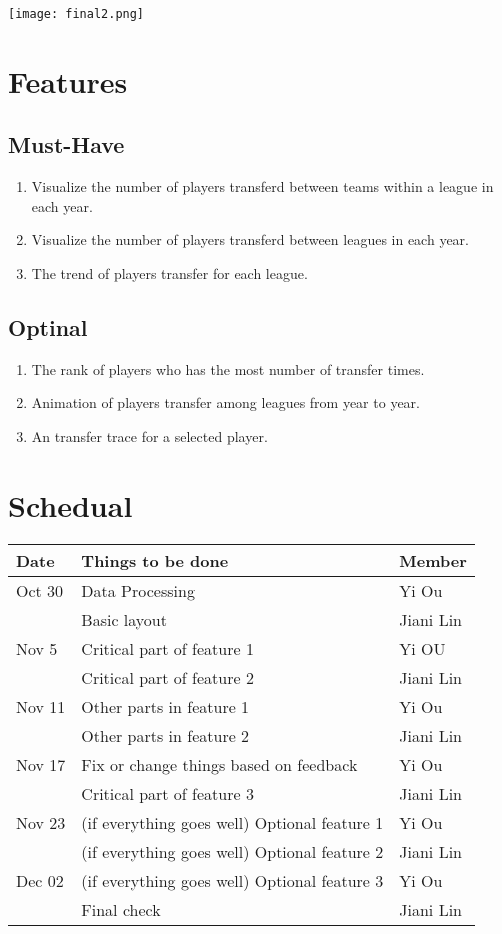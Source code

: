 \documentclass[11pt]{article}
\begin{document}
\texttt{[image: final2.png]}

\section{Features}
\label{sec-5}
\subsection{Must-Have}
\label{sec-5-1}
\begin{enumerate}
\item Visualize the number of players transferd between teams within a league in each year.
\item Visualize the number of players transferd between leagues in each year.
\item The trend of players transfer for each league.
\end{enumerate}
\subsection{Optinal}
\label{sec-5-2}
\begin{enumerate}
\item The rank of players who has the most number of transfer times.
\item Animation of players transfer among leagues from year to year.
\item An transfer trace for a selected player.
\end{enumerate}
\section{Schedual}
\label{sec-6}

\begin{center}
\begin{tabular}{lll}
Date & Things to be done & Member\\
\hline
Oct 30 & Data Processing & Yi Ou\\
 & Basic layout & Jiani Lin\\
\hline
Nov 5 & Critical part of feature 1 & Yi OU\\
 & Critical part of feature 2 & Jiani Lin\\
\hline
Nov 11 & Other parts in feature 1 & Yi Ou\\
 & Other parts in feature 2 & Jiani Lin\\
\hline
Nov 17 & Fix or change things based on feedback & Yi Ou\\
 & Critical part of feature 3 & Jiani Lin\\
\hline
Nov 23 & (if everything goes well) Optional feature 1 & Yi Ou\\
 & (if everything goes well) Optional feature 2 & Jiani Lin\\
\hline
Dec 02 & (if everything goes well) Optional feature 3 & Yi Ou\\
 & Final check & Jiani Lin\\
\hline
\end{tabular}
\end{center}
\end{document}
